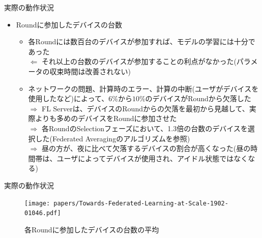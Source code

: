 \documentclass[dvipdfmx,notheorems,t]{beamer}
\begin{document}
\begin{frame}{実際の動作状況}

\begin{itemize}
	\item Roundに参加したデバイスの台数
	\begin{itemize}
		\item 各Roundには数百台のデバイスが参加すれば、モデルの学習には十分であった \\
		$\Leftarrow$ それ以上の台数のデバイスが参加することの利点がなかった(パラメータの収束時間は改善されない)
		\newline
		
		\item ネットワークの問題、計算時のエラー、計算の中断(ユーザがデバイスを使用したなど)によって、$6\%$から$10\%$のデバイスがRoundから欠落した \\
		$\Rightarrow$ FL Serverは、デバイスのRoundからの欠落を最初から見越して、実際よりも多めのデバイスをRoundに参加させた \\
		$\Rightarrow$ 各RoundのSelectionフェーズにおいて、1.3倍の台数のデバイスを選択した(Federated Averagingのアルゴリズムを参照) \\
		$\Rightarrow$ 昼の方が、夜に比べて欠落するデバイスの割合が高くなった(昼の時間帯は、ユーザによってデバイスが使用され、アイドル状態ではなくなる)
	\end{itemize}
\end{itemize}

\end{frame}

\begin{frame}{実際の動作状況}

\begin{figure}
	\centering
	\texttt{[image: papers/Towards-Federated-Learning-at-Scale-1902-01046.pdf]}
	\caption{各Roundに参加したデバイスの台数の平均~\cite{1902.01046}}
	\label{fig:devices-per-round}
\end{figure}

\end{frame}
\end{document}
